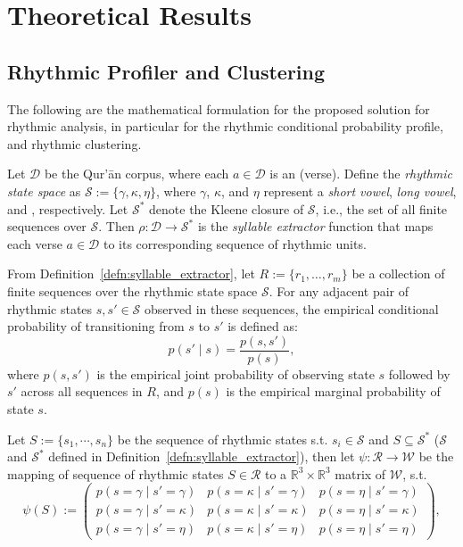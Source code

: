 \chapter{Theoretical Results}
\label{appendix:theoretical_results}
\setcounter{section}{1}
\section{Rhythmic Profiler and Clustering}
The following are the mathematical formulation for the proposed solution for rhythmic analysis, in particular for the rhythmic conditional probability profile, and rhythmic clustering.
\begin{defn}\label{defn:syllable_extractor}
    Let $\mathscr{D}$ be the Qur'\=an corpus, where each $a \in \mathscr{D}$ is an   (verse). Define the \textit{rhythmic state space} as $\mathscr{S} := \{\gamma, \kappa, \eta\}$, where $\gamma$, $\kappa$, and $\eta$ represent a \textit{short vowel}, \textit{long vowel}, and  , respectively. Let $\mathscr{S}^*$ denote the Kleene closure of $\mathscr{S}$, i.e., the set of all finite sequences over $\mathscr{S}$. Then $\rho : \mathscr{D} \rightarrow \mathscr{S}^*$ is the \textit{syllable extractor} function that maps each verse $a \in \mathscr{D}$ to its corresponding sequence of rhythmic units.
\end{defn}
\begin{defn}
    From Definition~\ref{defn:syllable_extractor}, let $R := \{r_1, \dots, r_m\}$ be a collection of finite sequences over the rhythmic state space $\mathscr{S}$. For any adjacent pair of rhythmic states $s, s' \in \mathscr{S}$ observed in these sequences, the empirical conditional probability of transitioning from $s$ to $s'$ is defined as:
    \[
        p(s' \mid s) = \frac{p(s, s')}{p(s)},
    \]
    where $p(s, s')$ is the empirical joint probability of observing state $s$ followed by $s'$ across all sequences in $R$, and $p(s)$ is the empirical marginal probability of state $s$.
\end{defn}
\begin{defn}
    Let $S:=\{s_1,\cdots,s_n\}$ be the sequence of rhythmic states s.t. $s_i\in\mathscr{S}$ and $S\subseteq\mathscr{S}^*$ ($\mathscr{S}$ and $\mathscr{S}^*$ defined in Definition~\ref{defn:syllable_extractor}), then let $\psi:\mathscr{R}\rightarrow\mathscr{W}$ be the mapping of sequence of rhythmic states $S\in\mathscr{R}$ to a $\mathbb{R}^{3}\times\mathbb{R}^3$ matrix of $\mathscr{W}$, s.t.
    \begin{equation}
        \psi(S):=\begin{pmatrix}
            p(s=\gamma\mid s'=\gamma) & p(s=\kappa\mid s'=\gamma) & p(s=\eta\mid s'=\gamma) \\
            p(s=\gamma\mid s'=\kappa) & p(s=\kappa\mid s'=\kappa) & p(s=\eta\mid s'=\kappa) \\
            p(s=\gamma\mid s'=\eta) & p(s=\kappa\mid s'=\eta) & p(s=\eta\mid s'=\eta)
            \end{pmatrix},
    \end{equation}
\end{defn}


